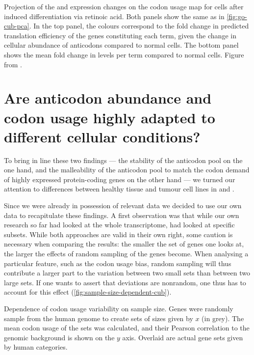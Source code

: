     {Projection of the \trna and \mrna expression changes on the codon usage
    map for cells after induced differentiation via retinoic acid.}
    {Both panels show the same \pca as in \cref{fig:go-cub-pca}. In the top
    panel, the colours correspond to the fold change in predicted translation
    efficiency of the genes constituting each \go term, given the change in
    cellular abundance of \trna anticodons compared to normal cells. The bottom
    panel shows the mean fold change in \mrna levels per \go term compared to
    normal cells. Figure from \citet{Gingold:2014}.}

\section{Are  anticodon abundance and codon usage highly adapted to
different cellular conditions?}

To bring in line these two findings — the stability of the anticodon pool on the
one hand, and the malleability of the anticodon pool to match the codon demand
of highly expressed protein-coding genes on the other hand — we turned our
attention to differences between healthy tissue and tumour cell lines in \mmu
and \hsa.

Since we were already in possession of relevant \trna data we decided to use our
own data to recapitulate these findings. A first observation was that while our
own research so far had looked at the whole transcriptome, \citet{Gingold:2014}
had looked at specific subsets. While both approaches are valid in their own
right, some caution is necessary when comparing the results: the smaller the set
of genes one looks at, the larger the effects of random sampling of the genes
become. When analysing a particular feature, such as the codon usage bias,
random sampling will thus contribute a larger part to the variation between two
small sets than between two large sets. If one wants to assert that deviations
are nonrandom, one thus has to account for this effect
(\cref{fig:sample-size-dependent-cub}).

    {Dependence of codon usage variability on sample size.}
    {Genes were randomly sample from the human genome to create sets of sizes
    given by \(x\) (in grey). The mean codon usage of the sets was calculated,
    and their Pearson correlation to the genomic background is shown on the
    \(y\) axis. Overlaid are actual gene sets given by human \go categories.}

